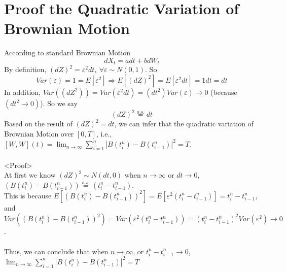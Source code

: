 \documentclass[12pt]{article}
\begin{document}
\section{Proof the Quadratic Variation of Brownian Motion}
According to standard Brownian Motion
\[
    dX_t = adt + bdW_t  
\]
By definition, $(dZ)^2 = \varepsilon^2 dt,\ \forall \varepsilon\sim N(0, 1)$. So
\[
    Var(\varepsilon) = 1 = E[\varepsilon^2] \Rightarrow E[(dZ)^2] = E[\varepsilon^2 dt] = 1dt = dt  
\]
In addition, $Var((dZ^2)) = Var(\varepsilon^2 dt) = (dt^2)Var(\varepsilon) \to 0$ (because $(dt^2\to 0)$). So we say
\[
    (dZ)^2 \stackrel{a.s.}{=} dt
\]  
Based on the result of $(dZ)^2 = dt$, we can infer that the quadratic variation of Brownian Motion over $[0, T]$, i.e., $[W,W](t) = \lim_{n\to\infty}\sum_{i=1}^n|B(t_i^n)-B(t_{i-1}^n)|^2=T$.\\\\
<Proof>\\
At first we know $(dZ)^2\sim N(dt, 0)$ when $n\to\infty$ or $dt\to 0$, $(B(t_i^n)-B(t_{i-1}^n))\stackrel{a.s.}{=}(t_i^n-t_{i-1}^n)$.\\
This is because $E[(B(t_i^n)-B(t_{i-1}^n))^2] = E[\varepsilon^2(t_i^n-t_{i-1}^n)] = t_i^n - t_{i-1}^n$, and\\
$Var((B(t_i^n)-B(t_{i-1}^n))^2) = Var(\varepsilon^2(t_i^n-t_{i-1}^n)) = (t_i^n - t_{i-1}^n)^2Var(\varepsilon^2)\to 0$.\\\\
Thus, we can conclude that when $n\to \infty$, or $t_i^n-t_{i-1}^n \to 0$, $\lim_{n\to\infty}\sum_{i=1}^n|B(t_i^n)-B(t_{i-1}^n)|^2=T$






\newpage
\end{document}
